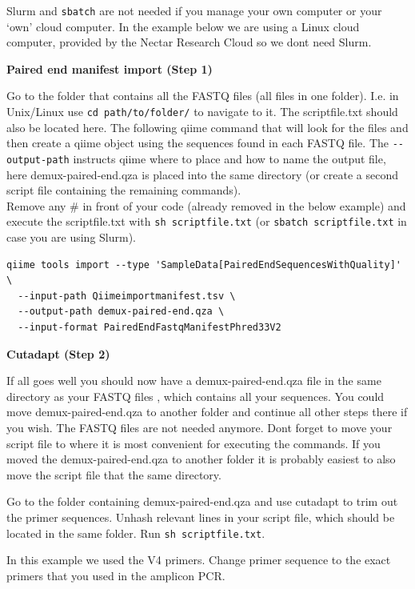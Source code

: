 \documentclass[
]{book}
\begin{document}
Slurm and \texttt{sbatch} are not needed if you manage your own computer or your `own' cloud computer. In the example below we are using a Linux cloud computer, provided by the Nectar Research Cloud so we dont need Slurm.

\hfill\break

\textbf{Paired end manifest import (Step 1)}

Go to the folder that contains all the FASTQ files (all files in one folder). I.e. in Unix/Linux use \texttt{cd\ path/to/folder/} to navigate to it. The scriptfile.txt should also be located here. The following qiime command that will look for the files and then create a qiime object using the sequences found in each FASTQ file. The \texttt{-\/-output-path} instructs qiime where to place and how to name the output file, here demux-paired-end.qza is placed into the same directory (or create a second script file containing the remaining commands).\\
Remove any \# in front of your code (already removed in the below example) and execute the scriptfile.txt with \texttt{sh\ scriptfile.txt} (or \texttt{sbatch\ scriptfile.txt} in case you are using Slurm).

\begin{verbatim}
qiime tools import --type 'SampleData[PairedEndSequencesWithQuality]' \
  --input-path Qiimeimportmanifest.tsv \
  --output-path demux-paired-end.qza \
  --input-format PairedEndFastqManifestPhred33V2
\end{verbatim}

\hfill\break

\textbf{Cutadapt (Step 2)}

If all goes well you should now have a demux-paired-end.qza file in the same directory as your FASTQ files , which contains all your sequences. You could move demux-paired-end.qza to another folder and continue all other steps there if you wish. The FASTQ files are not needed anymore. Dont forget to move your script file to where it is most convenient for executing the commands. If you moved the demux-paired-end.qza to another folder it is probably easiest to also move the script file that the same directory.

Go to the folder containing demux-paired-end.qza and use cutadapt to trim out the primer sequences. Unhash relevant lines in your script file, which should be located in the same folder. Run \texttt{sh\ scriptfile.txt}.

In this example we used the V4 primers. Change primer sequence to the exact primers that you used in the amplicon PCR.
\end{document}
